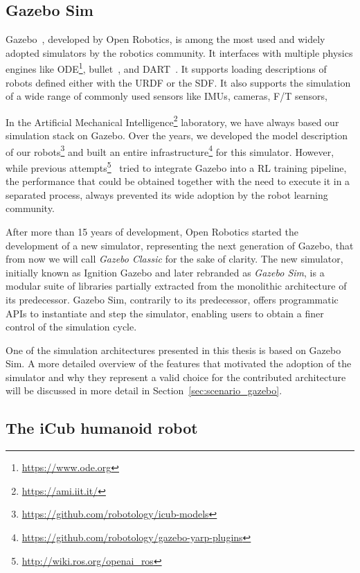 \subsection{Gazebo Sim}

Gazebo~\parencite{koenig_design_2004}, developed by Open Robotics, is among the most used and widely adopted simulators by the robotics community.
It interfaces with multiple physics engines like ODE\footnote{\url{https://www.ode.org}}, bullet~\parencite{coumans_pybullet_2016}, and DART~\parencite{lee_dart_2018}.
It supports loading descriptions of robots defined either with the \ac{URDF} or the \ac{SDF}.
It also supports the simulation of a wide range of commonly used sensors like \acp{IMU}, cameras, \ac{F/T} sensors, \etc

In the Artificial Mechanical Intelligence\footnote{\url{https://ami.iit.it/}} laboratory, we have always based our simulation stack on Gazebo.
Over the years, we developed the model description of our robots\footnote{\url{https://github.com/robotology/icub-models}} and built an entire infrastructure\footnote{\url{https://github.com/robotology/gazebo-yarp-plugins}} for this simulator.
However, while previous attempts\footnote{\url{http://wiki.ros.org/openai_ros}}~\parencite{zamora_extending_2017,lopez_gym-gazebo2_2019} tried to integrate Gazebo into a \ac{RL} training pipeline, the performance that could be obtained together with the need to execute it in a separated process, always prevented its wide adoption by the robot learning community.

After more than 15 years of development, Open Robotics started the development of a new simulator, representing the next generation of Gazebo, that from now we will call \emph{Gazebo Classic} for the sake of clarity.
The new simulator, initially known as Ignition Gazebo and later rebranded as \emph{Gazebo Sim}, is a modular suite of libraries partially extracted from the monolithic architecture of its predecessor.
Gazebo Sim, contrarily to its predecessor, offers programmatic \acp{API} to instantiate and step the simulator, enabling users to obtain a finer control of the simulation cycle.

One of the simulation architectures presented in this thesis is based on Gazebo Sim.
A more detailed overview of the features that motivated the adoption of the simulator and why they represent a valid choice for the contributed architecture will be discussed in more detail in Section~\ref{sec:scenario_gazebo}.

\subsection{The iCub humanoid robot}

